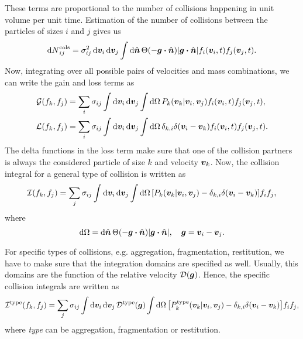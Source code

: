 \documentclass[aps,prl,preprint,groupedaddress,10pt]{revtex4-2}
\begin{document}
These terms are proportional to the number of collisions happening in unit volume per unit
time. Estimation of the number of collisions between the particles of sizes $i$ and $j$
gives us
\begin{equation}
    \utx{\dd{N}}{cols}_{ij}=\sigma_{ij}^2\dd{\bv_i}\dd{\bv_j}\int\dd{\bn}
    \Theta\pqty{-\bg\vdot\bn}\abs{\bg\vdot\bn}f_i\pqty{\bv_i,t}f_j\pqty{\bv_j,t}.
\end{equation}
Now, integrating over all possible pairs of velocities and mass combinations, we can write
the gain and loss terms as
\begin{equation}
    \begin{split}
        \mathcal{G}\pqty{f_k,f_j}&=\sum_{i}\sigma_{ij}\int\dd{\bv_i}\dd{\bv_j}
        \int\dd{\Omega}P_k\pqty{\bv_k\vert\bv_i,\bv_j}f_i\pqty{\bv_i,t}f_j\pqty{\bv_j,t},\\
        \mathcal{L}\pqty{f_k,f_j}&=\sum_{i}\sigma_{ij}\int\dd{\bv_i}\dd{\bv_j}
        \int\dd{\Omega}\delta_{k,i}\delta\pqty{\bv_i-\bv_k}f_i\pqty{\bv_i,t}f_j\pqty{\bv_j,t}.
    \end{split}
\end{equation}
The delta functions in the loss term make sure that one of the collision partners is always
the considered particle of size $k$ and velocity $\vb*{v}_k$. Now, the collision integral for a
general type of collision is written as
\begin{equation}
    \mathcal{I}\pqty{f_k,f_j}=\sum_j\sigma_{ij}\int\dd{\bv_i}\dd{\bv_j}\int\dd{\Omega}
    \bqty{P_k\pqty{\bv_k\vert\bv_i,\bv_j}-\delta_{k,i}\delta\pqty{\bv_i-\bv_k}}f_if_j,
\end{equation}
where
\begin{equation}
    \dd{\Omega}=\dd{\bn}\Theta\pqty{-\bg\vdot\bn}\abs{\bg\vdot\bn},\quad\bg=\bv_i-\bv_j.
\end{equation}

For specific types of collisions, e.g. aggregation, fragmentation, restitution, we have
to make sure that the integration domains are specified as well. Usually, this domains are
the function of the relative velocity $\mathcal{D}(\vb*{g})$. Hence, the specific collision
integrals are written as
\begin{equation}
    \utx{\mathcal{I}}{type}\pqty{f_k,f_j}=\sum_j\sigma_{ij}\int\dd{\bv_i}\dd{\bv_j}
    \utx{\mathcal{D}}{type}(\bg)\int\dd{\Omega}\bqty{\utx{P_k}{type}
        \pqty{\bv_k\vert\bv_i,\bv_j}-\delta_{k,i}\delta\pqty{\bv_i-\bv_k}}f_if_j,
\end{equation}
where \emph{type} can be aggregation, fragmentation or restitution.
\end{document}

